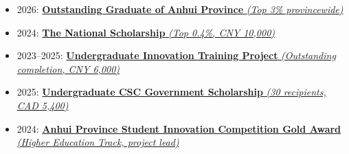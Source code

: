 \begin{itemize}[left=0pt, itemsep=3pt]
    \item 2026: \href{https://bean-young.github.io/document/anhui-outstanding-graduate.jpg}{\textbf{Outstanding Graduate of Anhui Province} \emph{(Top 3\% provincewide)}}
    \item 2024: \href{https://bean-young.github.io/document/1.pdf}{\textbf{The National Scholarship} \emph{(Top 0.4\%, CNY 10,000)}}
    \item 2023--2025: \href{https://bean-young.github.io/document/12.pdf}{\textbf{Undergraduate Innovation Training Project} \emph{(Outstanding completion, CNY 6,000)}}
    \item 2025: \href{https://bean-young.github.io/document/2.pdf}{\textbf{Undergraduate CSC Government Scholarship} \emph{(30 recipients, CAD 5,400)}}
    \item 2024: \href{https://bean-young.github.io/document/3.pdf}{\textbf{Anhui Province Student Innovation Competition Gold Award} \emph{(Higher Education Track, project lead)}}
\end{itemize}
